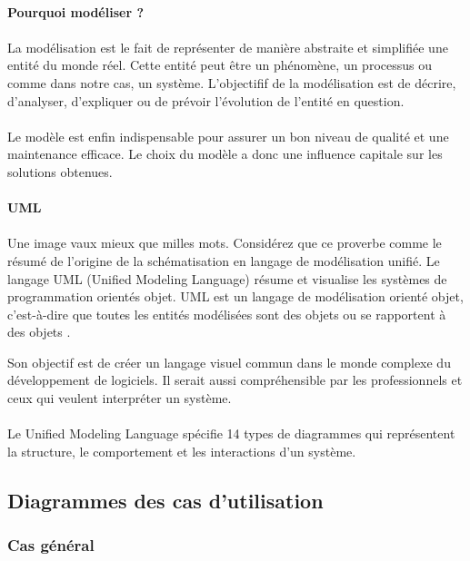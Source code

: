 
\paragraph{Pourquoi modéliser ?}
\paragraph{}
La modélisation est le fait de représenter de manière abstraite et simplifiée
une entité du monde réel. Cette entité peut être un phénomène, un processus ou 
comme dans notre cas, un système. L'objectifif de la modélisation est de décrire,
d'analyser, d'expliquer ou de prévoir l'évolution de l'entité en question.
\paragraph{}
Le modèle est enfin indispensable pour assurer un bon niveau de qualité 
et une maintenance efficace. Le choix du modèle a donc une influence capitale 
sur les solutions obtenues.
\paragraph{UML}
\paragraph{}
Une image vaux mieux que milles mots.
Considérez que ce proverbe comme le résumé de l'origine
de la schématisation en langage de modélisation unifié.
Le langage UML (Unified Modeling Language) résume et visualise les 
systèmes de programmation orientés objet. UML est un langage de 
modélisation orienté objet, c’est-à-dire que toutes 
les entités modélisées sont des objets ou se rapportent à des 
objets \cite{conan}.

Son objectif est de créer un langage visuel commun dans le monde 
complexe du développement de logiciels. Il serait aussi compréhensible
par les professionnels et ceux qui veulent interpréter un système. 
\paragraph{}
Le Unified Modeling Language spécifie 14 types de 
diagrammes qui représentent la structure, le comportement et les interactions d’un système.
\subsection{Diagrammes des cas d'utilisation}
    \subsubsection{Cas général}
